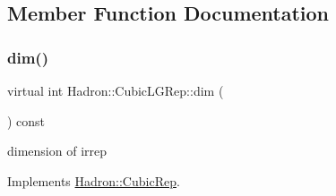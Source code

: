 \subsection{Member Function Documentation}
\mbox{\label{structHadron_1_1CubicLGRep_a3acbaea26503ed64f20df693a48e4cdd}} 
\subsubsection{\texorpdfstring{dim()}{dim()}\hspace{0.1cm}{\footnotesize\ttfamily [1/3]}}
{\footnotesize\ttfamily virtual int Hadron\+::\+Cubic\+L\+G\+Rep\+::dim (\begin{DoxyParamCaption}{ }\end{DoxyParamCaption}) const\hspace{0.3cm}{\ttfamily [pure virtual]}}

dimension of irrep 

Implements \mbox{\hyperlink{structHadron_1_1CubicRep_ac178d14064f037a66af4b9fb4b312d51}{Hadron\+::\+Cubic\+Rep}}.




